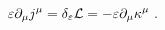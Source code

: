 \begin{equation}
 \varepsilon \partial_{\mu} j^{\mu} = \delta_{\varepsilon}{\cal{L}} = -\varepsilon \partial_{\mu} \kappa^{\mu}~. 
                                   \label{eq:byuzotuzyedi}
\end{equation}

